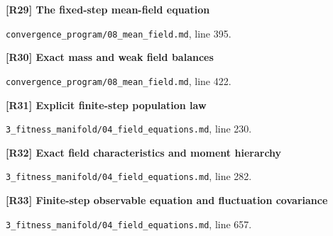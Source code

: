 \documentclass[11pt,a4paper]{article}
\begin{document}
\par\medskip\noindent\begin{minipage}{\linewidth}\textbf{[R29] The fixed-step mean-field equation}\label{src:thm-mean-field-equation}\par
{\small\texttt{}\par
\nolinkurl{convergence_program/08_mean_field.md}, line 395.\par}
\end{minipage}\par

\par\medskip\noindent\begin{minipage}{\linewidth}\textbf{[R30] Exact mass and weak field balances}\label{src:thm-mass-conservation}\par
{\small\texttt{}\par
\nolinkurl{convergence_program/08_mean_field.md}, line 422.\par}
\end{minipage}\par

\par\medskip\noindent\begin{minipage}{\linewidth}\textbf{[R31] Explicit finite-step population law}\label{src:thm-algorithmic-explicit-transition}\par
{\small\texttt{}\par
\nolinkurl{3_fitness_manifold/04_field_equations.md}, line 230.\par}
\end{minipage}\par

\par\medskip\noindent\begin{minipage}{\linewidth}\textbf{[R32] Exact field characteristics and moment hierarchy}\label{src:thm-algorithmic-field-characteristics}\par
{\small\texttt{}\par
\nolinkurl{3_fitness_manifold/04_field_equations.md}, line 282.\par}
\end{minipage}\par

\par\medskip\noindent\begin{minipage}{\linewidth}\textbf{[R33] Finite-step observable equation and fluctuation covariance}\label{src:thm-algorithmic-observable-increment}\par
{\small\texttt{}\par
\nolinkurl{3_fitness_manifold/04_field_equations.md}, line 657.\par}
\end{minipage}\par
\end{document}
